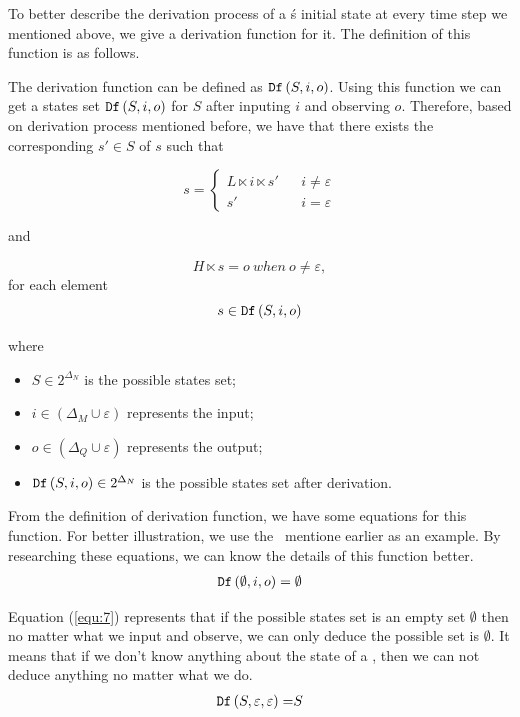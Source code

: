 To better describe the derivation process of a \BCN\'s initial state at every time step we mentioned above, we give a derivation function for it. The definition of this function is as follows.
\begin{definition} The derivation function can be defined as ${\tt Df}\left(S, i, o\right)$. Using this function we can get a states set ${\tt Df}\left(S, i, o\right)$ for $S$ after inputing $i$ and observing $o$. Therefore, based on derivation process mentioned before, we have that there exists the corresponding $s'\in S$ of $s$ such that 

\[s=\left\{
\begin{array}{rcl}
L\ltimes i\ltimes s'      &      & {i\neq \varepsilon}\\
s'       &      & {i= \varepsilon}
\end{array} \right. \]

and 

\[H\ltimes s=o\ when\ o\neq \varepsilon, \]
for each element \[s\in {\tt Df}\left(S, i, o\right)\]
\end{definition}
where   
\begin{itemize}
  \item $S\in 2^{\Delta_N}$ is the possible states set;
  \item $i\in (\Delta_M\cup\varepsilon)$ represents the input;
  \item $o\in(\Delta_Q\cup\varepsilon)$ represents the output; 
  \item ${\tt Df}\left(S, i, o\right)\in 2^{\Delta_N}$ is the possible states set after derivation.
\end{itemize} 
 
 From the definition of derivation function, we have some equations for this function. For better illustration, we use the \BCN\ mentione earlier as an example. By researching these equations, we can know the details of this function better.
\begin{equation}
\begin{split}
{\tt Df}\left(\emptyset,i,o\right)=\emptyset\\
\end{split}
\label{equ:7}
\end{equation}

Equation (\ref{equ:7}) represents that if the possible states set is an empty set $\emptyset$ then no matter what we input and observe, we can only deduce the possible set is $\emptyset$. It means that if we don't know anything about the state of a \BCN, then we can not deduce anything no matter what we do.
\begin{equation}
\begin{split}
{\tt Df}\left(S,\varepsilon,\varepsilon\right)=&S\\
\end{split}
\label{equ:8}
\end{equation}

